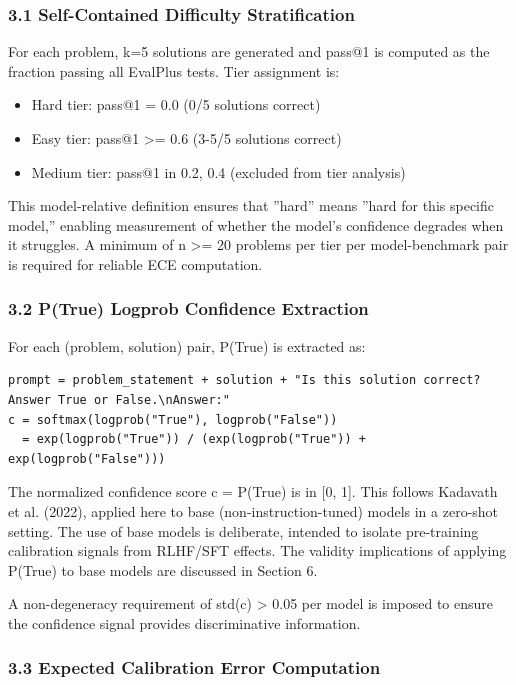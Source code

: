 
\subsubsection{3.1 Self-Contained Difficulty Stratification}

For each problem, k=5 solutions are generated and pass@1 is computed as the fraction passing all EvalPlus tests. Tier assignment is:

\begin{itemize}
\item Hard tier: pass@1 = 0.0 (0/5 solutions correct)
\item Easy tier: pass@1 >= 0.6 (3-5/5 solutions correct)
\item Medium tier: pass@1 in {0.2, 0.4} (excluded from tier analysis)
\end{itemize}

This model-relative definition ensures that ''hard'' means ''hard for this specific model,'' enabling measurement of whether the model's confidence degrades when it struggles. A minimum of n >= 20 problems per tier per model-benchmark pair is required for reliable ECE computation.

\subsubsection{3.2 P(True) Logprob Confidence Extraction}

For each (problem, solution) pair, P(True) is extracted as:

\begin{verbatim}
prompt = problem_statement + solution + "Is this solution correct? Answer True or False.\nAnswer:"
c = softmax(logprob("True"), logprob("False"))
  = exp(logprob("True")) / (exp(logprob("True")) + exp(logprob("False")))
\end{verbatim}

The normalized confidence score c = P(True) is in [0, 1]. This follows Kadavath et al. (2022), applied here to base (non-instruction-tuned) models in a zero-shot setting. The use of base models is deliberate, intended to isolate pre-training calibration signals from RLHF/SFT effects. The validity implications of applying P(True) to base models are discussed in Section 6.

A non-degeneracy requirement of std(c) > 0.05 per model is imposed to ensure the confidence signal provides discriminative information.

\subsubsection{3.3 Expected Calibration Error Computation}

